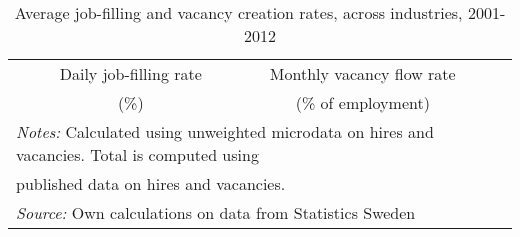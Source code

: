 \begin{table}[htbp]\centering
\def\sym#1{\ifmmode^{#1}\else\(^{#1}\)\fi}
\caption{Average job-filling and vacancy creation rates, across industries, 2001-2012}
\label{tab:filling_creation_rates_by_industry}
\begin{tabular}{l*{3}{c}}
\hline\hline
                &\multicolumn{1}{c}{Daily job-filling rate}&\multicolumn{1}{c}{Monthly vacancy flow rate}\\
								&\multicolumn{1}{c}{(\%)}&\multicolumn{1}{c}{(\% of employment)}\\
								\hline

\hline

\hline\hline
\multicolumn{3}{l}{\footnotesize \emph{Notes:} Calculated using unweighted microdata on hires and vacancies. Total is computed using}\\
\multicolumn{3}{l}{\footnotesize  published data on hires and vacancies.}\\
\multicolumn{3}{l}{\footnotesize \emph{Source:} Own calculations on data from Statistics Sweden}\\
\end{tabular}
\end{table}
